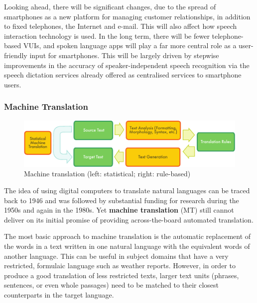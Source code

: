\begin{multicols}{2}
Looking ahead, there will be significant changes, due to the spread of smartphones as a new platform for managing customer relationships, in addition to fixed telephones, the Internet and e-mail. This will also affect how speech interaction technology is used. In the long term, there will be fewer telephone-based VUIs, and spoken language apps will play a far more central role as a user-friendly input for smartphones. This will be largely driven by stepwise improvements in the accuracy of speaker-independent speech recognition via the speech dictation services already offered as centralised services to smartphone users.

\subsubsection{Machine Translation}

\begin{figure}[htb]
  \center
  \includegraphics[width=\textwidth]{../_media/english/machine_translation}
  \caption{Machine translation (left: statistical; right: rule-based)}
\label{fig:mtarch_en}
\end{figure}

The idea of using digital computers to translate natural languages can be traced back to 1946 and was followed by substantial funding for research during the 1950s and again in the 1980s. 
Yet \textbf{machine translation} (MT) still cannot deliver on its initial promise of providing across-the-board automated translation.  

The most basic approach to machine translation is the automatic replacement of the words in a text written in one natural language with the equivalent words of another language. This can be useful in subject domains that have a very restricted, formulaic language such as weather reports.
However, in order to produce a good translation of less restricted texts, larger text units (phrases, sentences, or even whole passages) need to be matched to their closest counterparts in the target language. 



\end{multicols}
